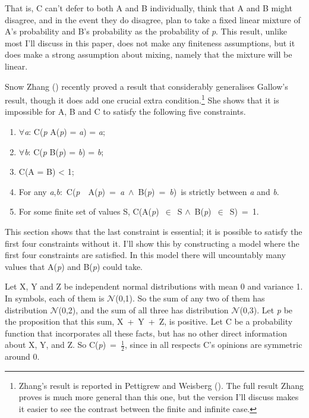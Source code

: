 \documentclass[
  12pt,
  letterpaper,
  DIV=11,
  numbers=noendperiod]{scrartcl}
\providecommand{\tightlist}{%
  \setlength{\itemsep}{0pt}\setlength{\parskip}{0pt}}\usepackage{longtable,booktabs,array}
\begin{document}
That is, C can't defer to both A and B individually, think that A and B
might disagree, and in the event they do disagree, plan to take a fixed
linear mixture of A's probability and B's probability as the probability
of \emph{p}. This result, unlike most I'll discuss in this paper, does
not make any finiteness assumptions, but it does make a strong
assumption about mixing, namely that the mixture will be linear.

Snow Zhang () recently proved a
result that considerably generalises Gallow's result, though it does add
one crucial extra condition.\footnote{Zhang's result is reported in
  Pettigrew and Weisberg ().
  The full result Zhang proves is much more general than this one, but
  the version I'll discuss makes it easier to see the contrast between
  the finite and infinite case.} She shows that it is impossible for A,
B and C to satisfy the following five constraints.

\begin{enumerate}
\def\labelenumi{\arabic{enumi}.}
\tightlist
\item
  $\forall$\emph{a}: C(\emph{p} \textbar{} A(\emph{p}) = \emph{a}) = \emph{a};
\item
  $\forall$\emph{b}: C(\emph{p} \textbar{} B(\emph{p}) = \emph{b}) = \emph{b};
\item
  C(A = B) \textless{} 1;
\item
  For any
  \emph{a},\emph{b}:~C(\emph{p}~\textbar~A(\emph{p})~=~\emph{a}~$\wedge$~B(\emph{p})~=~\emph{b})~is
  strictly between \emph{a} and \emph{b}.
\item
  For some finite set of values S, C(A(\emph{p})~$\in$~S
  $\wedge$~B(\emph{p})~$\in$~S)~=~1.
\end{enumerate}

This section shows that the last constraint is essential; it is possible
to satisfy the first four constraints without it. I'll show this by
constructing a model where the first four constraints are satisfied. In
this model there will uncountably many values that A(\emph{p}) and
B(\emph{p}) could take.

Let X, Y and Z be independent normal distributions with mean 0 and
variance 1. In symbols, each of them is \(\mathcal{N}\)(0,1). So the sum
of any two of them has distribution \(\mathcal{N}\)(0,2), and the sum of
all three has distribution \(\mathcal{N}\)(0,3). Let \emph{p} be the
proposition that this sum, X~+~Y~+~Z, is positive. Let C be a
probability function that incorporates all these facts, but has no other
direct information about X, Y, and Z. So C(\emph{p})~=~$\frac{1}{2}$, since in all
respects C's opinions are symmetric around 0.
\end{document}
